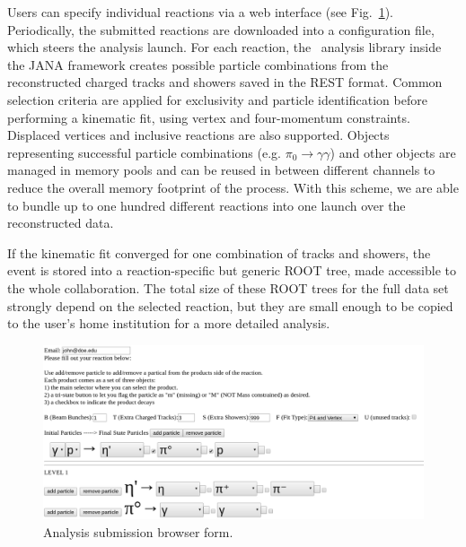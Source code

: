 Users can specify individual reactions via a web interface (see Fig.~\ref{fig:production_analysis}). Periodically, the submitted reactions are downloaded into a configuration file, which steers the analysis launch. For each reaction, the \GX~analysis library inside the JANA framework creates possible particle combinations from the reconstructed charged tracks and showers saved in the REST format. Common selection criteria are applied for exclusivity and particle identification before performing a kinematic fit, using vertex and four-momentum constraints. Displaced vertices and inclusive reactions are also supported. Objects representing successful particle combinations (e.g. $\pi_0 \rightarrow \gamma\gamma$) and other objects are managed in memory pools and can be reused in between different channels to reduce the overall memory footprint of the process. With this scheme, we are able to bundle up to one hundred different reactions into one launch over the reconstructed data.

If the kinematic fit converged for one combination of tracks and showers, the event is stored into a reaction-specific but generic ROOT tree, made accessible to the whole collaboration. The total size of these ROOT trees for the full data set strongly depend on the selected reaction, but they are small enough to be copied to the user's home institution for a more detailed analysis.

\begin{figure}[h!]\centering
\includegraphics[width=\textwidth]{figures/analysis_submit_form.png}
\caption[]{\label{fig:production_analysis}Analysis submission browser form.} 
\end{figure}